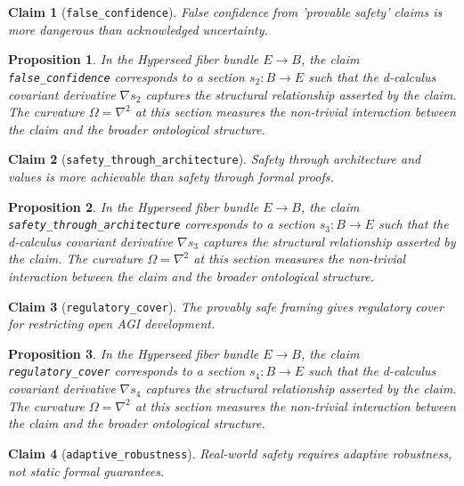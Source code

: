 \documentclass{article}
\newtheorem{claim}{Claim}
\newtheorem{proposition}{Proposition}
\begin{document}
\begin{claim}[\texttt{false_confidence}]
False confidence from 'provable safety' claims is more dangerous than acknowledged uncertainty.
\end{claim}

\begin{proposition}
In the Hyperseed fiber bundle $E \to B$, the claim \texttt{false_confidence} corresponds to a section $s_2: B \to E$ such that the d-calculus covariant derivative $\nabla s_2$ captures the structural relationship asserted by the claim. The curvature $\Omega = \nabla^2$ at this section measures the non-trivial interaction between the claim and the broader ontological structure.
\end{proposition}

\begin{claim}[\texttt{safety_through_architecture}]
Safety through architecture and values is more achievable than safety through formal proofs.
\end{claim}

\begin{proposition}
In the Hyperseed fiber bundle $E \to B$, the claim \texttt{safety_through_architecture} corresponds to a section $s_3: B \to E$ such that the d-calculus covariant derivative $\nabla s_3$ captures the structural relationship asserted by the claim. The curvature $\Omega = \nabla^2$ at this section measures the non-trivial interaction between the claim and the broader ontological structure.
\end{proposition}

\begin{claim}[\texttt{regulatory_cover}]
The provably safe framing gives regulatory cover for restricting open AGI development.
\end{claim}

\begin{proposition}
In the Hyperseed fiber bundle $E \to B$, the claim \texttt{regulatory_cover} corresponds to a section $s_4: B \to E$ such that the d-calculus covariant derivative $\nabla s_4$ captures the structural relationship asserted by the claim. The curvature $\Omega = \nabla^2$ at this section measures the non-trivial interaction between the claim and the broader ontological structure.
\end{proposition}

\begin{claim}[\texttt{adaptive_robustness}]
Real-world safety requires adaptive robustness, not static formal guarantees.
\end{claim}
\end{document}

